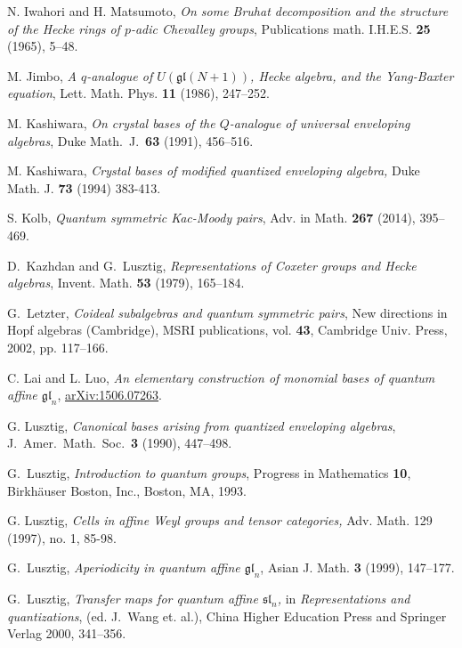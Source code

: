 \documentclass[12pt,reqno]{amsart}
\numberwithin{equation}{section}
\theoremstyle{definition}
\theoremstyle{plain}
\begin{document}
\begin{thebibliography}{DDPW08}
 N. Iwahori and H. Matsumoto,
{\em On some Bruhat decomposition and the structure of the
Hecke rings of $p$-adic Chevalley groups}, 
Publications math. I.H.E.S. {\bf 25} (1965), 5--48.

 M. Jimbo,
{\em A $q$-analogue of $U({\mathfrak g\mathfrak l}(N+1))$, Hecke
algebra, and the Yang-Baxter equation}, Lett. Math. Phys. {\bf 11}
(1986), 247--252.

M. Kashiwara,
{\em On crystal bases of the $Q$-analogue of universal enveloping algebras}, 
Duke Math.~J.~{\bf 63} (1991), 456--516.

 M. Kashiwara,
{\em Crystal bases of modified quantized enveloping algebra,}
Duke Math. J. {\bf 73} (1994) 383-413.

S. Kolb,
{\em Quantum symmetric Kac-Moody pairs}, 
Adv. in Math. {\bf 267} (2014), 395--469.
		

D.~Kazhdan and G.~Lusztig,
{\em Representations of {C}oxeter groups and {H}ecke algebras},
Invent. Math. {\bf 53} (1979), 165--184.

          
G.~Letzter, {\em Coideal subalgebras and quantum symmetric pairs}, 
New directions in Hopf algebras (Cambridge), MSRI publications, vol. {\bf 43}, Cambridge Univ. Press, 2002, pp. 117--166.

C. Lai and L. Luo, 
{\em An elementary construction of monomial bases of quantum affine $\mathfrak{gl}_n$},
\href{http://arxiv.org/abs/1506.07263}{arXiv:1506.07263}.

 G. Lusztig, 
{\em Canonical bases arising from
quantized enveloping algebras}, J.~Amer.~Math.~Soc.~{\bf 3} (1990), 447--498.

G.~Lusztig, 
{\em Introduction to quantum groups}, 
Progress in Mathematics {\bf 10},
Birkh\"auser Boston, Inc., Boston, MA, 1993.

G.  Lusztig,
{\em Cells in affine Weyl groups and tensor categories,}
Adv. Math. 129 (1997), no. 1, 85-98.

G.~Lusztig,
{\em Aperiodicity in quantum affine $\mathfrak{gl}_n$}, Asian J. Math. {\bf 3} (1999), 147--177.

G.~Lusztig, {\em Transfer maps for quantum affine $\mathfrak{sl}_n$,} 
in 
{\em Representations and quantizations}, (ed.  J.~Wang et. al.), 
China Higher Education Press and Springer Verlag 2000, 341--356. 


\end{thebibliography}
\end{document}
